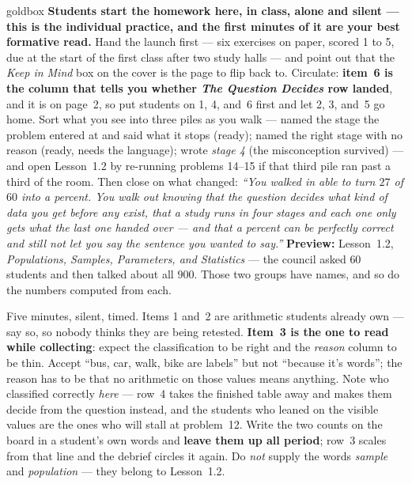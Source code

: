 \documentclass[10pt]{article}
\begin{document}
\boxguard
\begin{skillbox}{goldbox}
\textbf{Students start the homework here, in class, alone and silent --- this is the individual
practice, and the first minutes of it are your best formative read.} Hand the launch first ---
six exercises on paper, scored 1 to 5, due at the start of the first class after two study
halls --- and point out that the \emph{Keep in Mind} box on the cover is the page to flip back
to. Circulate: \textbf{item~6 is the column that tells you whether \emph{The Question Decides}
row landed}, and it is on page~2, so put students on 1, 4, and~6 first and let 2, 3, and~5 go
home. Sort what you see into three piles as you walk --- named the stage the problem entered
at and said what it stops (ready); named the right stage with no reason (ready, needs the
language); wrote \emph{stage 4} (the misconception survived) --- and open Lesson~1.2 by
re-running problems 14--15 if that third pile ran past a third of the room. Then close on what
changed: \emph{``You walked in able to turn $27$ of $60$ into a percent. You walk out knowing
that the question decides what kind of data you get before any exist, that a study runs in
four stages and each one only gets what the last one handed over --- and that a percent can be
perfectly correct and still not let you say the sentence you wanted to say.''}
\textbf{Preview:} Lesson~1.2, \emph{Populations, Samples, Parameters, and Statistics} --- the
council asked $60$ students and then talked about all $900$. Those two groups have names, and
so do the numbers computed from each.
\end{skillbox}

\begin{teachernote}[Warm-Up]
Five minutes, silent, timed. Items 1 and~2 are arithmetic students already own --- say so, so
nobody thinks they are being retested. \textbf{Item~3 is the one to read while collecting}:
expect the classification to be right and the \emph{reason} column to be thin. Accept
``bus, car, walk, bike are labels'' but not ``because it's words''; the reason has to be that
no arithmetic on those values means anything. Note who classified correctly \emph{here} ---
row~4 takes the finished table away and makes them decide from the question instead, and the
students who leaned on the visible values are the ones who will stall at problem~12. Write the
two counts on the board in a student's own words and \textbf{leave them up all period}; row~3
scales from that line and the debrief circles it again. Do \emph{not} supply the words
\emph{sample} and \emph{population} --- they belong to Lesson~1.2.
\end{teachernote}
\end{document}
